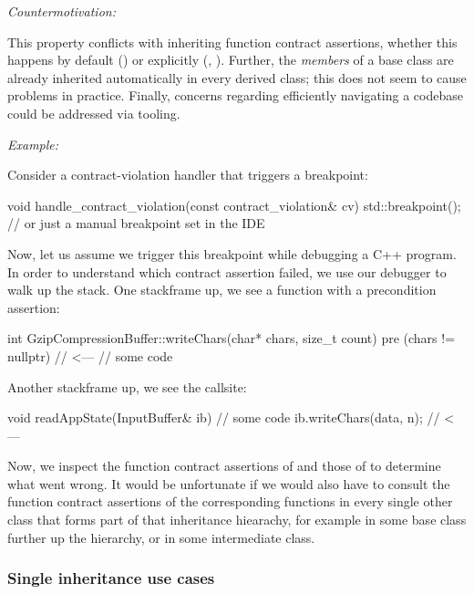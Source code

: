 \emph{Countermotivation:}

This property conflicts with inheriting function contract assertions, whether this happens by default () or explicitly (, ). Further, the \emph{members} of a base class are already inherited automatically in every derived class; this does not seem to cause problems in practice. Finally, concerns regarding efficiently navigating a codebase could be addressed via tooling.

\emph{Example:}

Consider a contract-violation handler that triggers a breakpoint:

\begin{codeblock}
void handle_contract_violation(const contract_violation& cv) {
    std::breakpoint(); // or just a manual breakpoint set in the IDE
}
\end{codeblock}

Now, let us assume we trigger this breakpoint while debugging a C++ program. In order to understand which contract assertion failed, we use our debugger to walk up the stack.  One stackframe up, we see a function with a precondition assertion:

\begin{codeblock}
int GzipCompressionBuffer::writeChars(char* chars, size_t count)
pre (chars != nullptr) {   // <---
  // some code
}
\end{codeblock}

Another stackframe up, we see the callsite:

\begin{codeblock}
void readAppState(InputBuffer& ib) {
  // some code
  ib.writeChars(data, n);   // <---
}
\end{codeblock}

Now, we inspect the function contract assertions of \allowbreak{} and those of \allowbreak{} to determine what went wrong. It would be unfortunate if we would also have to consult the function contract assertions of the corresponding functions in every single other class that forms part of that inheritance hiearachy, for example \allowbreak{} in some base class further up the hierarchy, or \allowbreak{} in some intermediate class.


\subsubsection{Single inheritance use cases}

